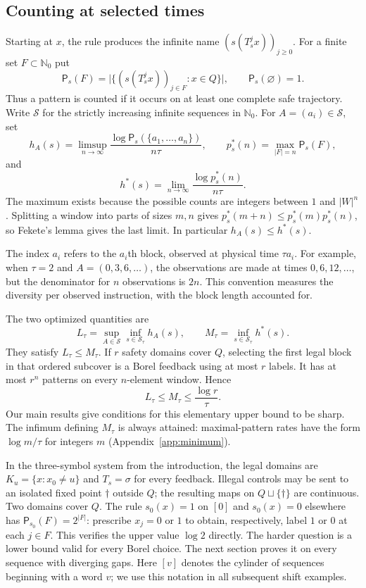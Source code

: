 \documentclass[11pt,reqno]{amsart}
\numberwithin{equation}{section}
\theoremstyle{definition}
\theoremstyle{definition}
\newcommand{\Nzero}{\mathbb N_0}
\newcommand{\Patt}{\mathsf P}
\newcommand{\Ssafe}{\mathcal S}
\begin{document}
\subsection{Counting at selected times}
Starting at $x$, the rule produces the infinite name
$(s(T_s^jx))_{j\ge0}$. For a finite set $F\subset\Nzero$ put
\[
 \Patt_s(F)=\bigl|\{(s(T_s^jx))_{j\in F}:x\in Q\}\bigr|,
 \qquad \Patt_s(\varnothing)=1.
\]
Thus a pattern is counted if it occurs on at least one complete safe
trajectory. Write $\mathscr S$ for the strictly increasing infinite
sequences in $\Nzero$. For $A=(a_i)\in\mathscr S$, set
\[
 h_A(s)=\limsup_{n\to\infty}\frac{\log\Patt_s(\{a_1,\ldots,a_n\})}{n\tau},
 \qquad p_s^*(n)=\max_{|F|=n}\Patt_s(F),
\]
and
\[
 h^*(s)=\lim_{n\to\infty}\frac{\log p_s^*(n)}{n\tau}.
\]
The maximum exists because the possible counts are integers between
$1$ and $|W|^n$. Splitting a window into parts of sizes $m,n$ gives
$p_s^*(m+n)\le p_s^*(m)p_s^*(n)$, so Fekete's lemma gives the
last limit. In particular $h_A(s)\le h^*(s)$.

The index $a_i$ refers to the $a_i$th block, observed at physical
time $\tau a_i$. For example, when $\tau=2$ and $A=(0,3,6,\ldots)$,
the observations are made at times $0,6,12,\ldots$, but the denominator
for $n$ observations is $2n$. This convention measures the diversity
per observed instruction, with the block length accounted for.

The two optimized quantities are
\begin{equation}\label{cc-eq:LM}
 L_\tau=\sup_{A\in\mathscr S}\inf_{s\in\Ssafe_\tau}h_A(s),
 \qquad M_\tau=\inf_{s\in\Ssafe_\tau}h^*(s).
\end{equation}
They satisfy $L_\tau\le M_\tau$. If $r$ safety domains cover
$Q$, selecting the first legal block in that ordered subcover is a
Borel feedback using at most $r$ labels. It has at most $r^n$
patterns on every $n$-element window. Hence
\[
 L_\tau\le M_\tau\le\frac{\log r}{\tau}.
\]
Our main results give conditions for this elementary upper bound to
be sharp. The infimum defining $M_\tau$ is always attained:
maximal-pattern rates have the form $\log m/\tau$ for integers
$m$ (Appendix~\ref{app:minimum}).

In the three-symbol system from the introduction, the legal domains
are $K_u=\{x:x_0\ne u\}$ and $T_s=\sigma$ for every feedback.
Illegal controls may be sent to an isolated fixed point $\dagger$
outside $Q$; the resulting maps on $Q\sqcup\{\dagger\}$ are
continuous. Two domains cover $Q$. The rule $s_0(x)=1$ on
$[0]$ and $s_0(x)=0$ elsewhere has $\Patt_{s_0}(F)=2^{|F|}$:
prescribe $x_j=0$ or $1$ to obtain, respectively, label $1$ or $0$
at each $j\in F$. This verifies the upper value $\log2$ directly.
The harder question is a lower bound valid for every Borel choice.
The next section proves it on every sequence with diverging gaps.
Here $[v]$ denotes the cylinder of sequences beginning with a word $v$;
we use this notation in all subsequent shift examples.
\end{document}
